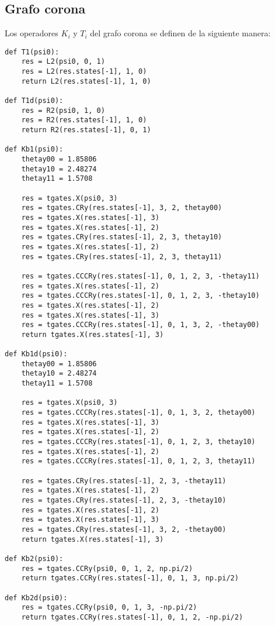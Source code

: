 \subsection{Grafo corona}

Los operadores $K_i$ y $T_i$ del grafo corona se definen de la siguiente manera:

\begin{verbatim}
def T1(psi0):
    res = L2(psi0, 0, 1)
    res = L2(res.states[-1], 1, 0)
    return L2(res.states[-1], 1, 0)

def T1d(psi0):
    res = R2(psi0, 1, 0)
    res = R2(res.states[-1], 1, 0)
    return R2(res.states[-1], 0, 1)

def Kb1(psi0):
    thetay00 = 1.85806
    thetay10 = 2.48274
    thetay11 = 1.5708

    res = tgates.X(psi0, 3)
    res = tgates.CRy(res.states[-1], 3, 2, thetay00)
    res = tgates.X(res.states[-1], 3)
    res = tgates.X(res.states[-1], 2)
    res = tgates.CRy(res.states[-1], 2, 3, thetay10)
    res = tgates.X(res.states[-1], 2)
    res = tgates.CRy(res.states[-1], 2, 3, thetay11)

    res = tgates.CCCRy(res.states[-1], 0, 1, 2, 3, -thetay11)
    res = tgates.X(res.states[-1], 2)
    res = tgates.CCCRy(res.states[-1], 0, 1, 2, 3, -thetay10)
    res = tgates.X(res.states[-1], 2)
    res = tgates.X(res.states[-1], 3)
    res = tgates.CCCRy(res.states[-1], 0, 1, 3, 2, -thetay00)
    return tgates.X(res.states[-1], 3)

def Kb1d(psi0):
    thetay00 = 1.85806
    thetay10 = 2.48274
    thetay11 = 1.5708

    res = tgates.X(psi0, 3)
    res = tgates.CCCRy(res.states[-1], 0, 1, 3, 2, thetay00)
    res = tgates.X(res.states[-1], 3)
    res = tgates.X(res.states[-1], 2)
    res = tgates.CCCRy(res.states[-1], 0, 1, 2, 3, thetay10)
    res = tgates.X(res.states[-1], 2)
    res = tgates.CCCRy(res.states[-1], 0, 1, 2, 3, thetay11)

    res = tgates.CRy(res.states[-1], 2, 3, -thetay11)
    res = tgates.X(res.states[-1], 2)
    res = tgates.CRy(res.states[-1], 2, 3, -thetay10)
    res = tgates.X(res.states[-1], 2)
    res = tgates.X(res.states[-1], 3)
    res = tgates.CRy(res.states[-1], 3, 2, -thetay00)
    return tgates.X(res.states[-1], 3)

def Kb2(psi0):
    res = tgates.CCRy(psi0, 0, 1, 2, np.pi/2)
    return tgates.CCRy(res.states[-1], 0, 1, 3, np.pi/2)

def Kb2d(psi0):
    res = tgates.CCRy(psi0, 0, 1, 3, -np.pi/2)
    return tgates.CCRy(res.states[-1], 0, 1, 2, -np.pi/2)
\end{verbatim}


